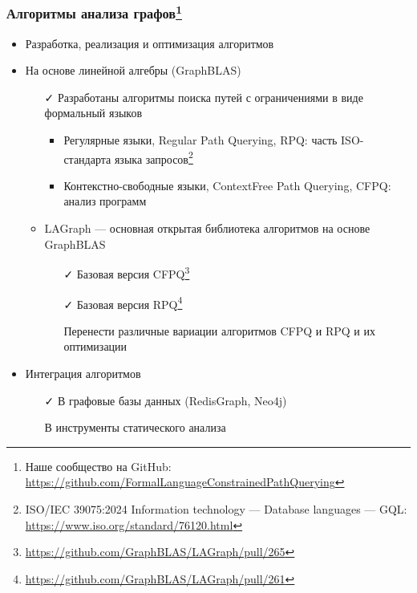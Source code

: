 \documentclass[xcolor=table,aspectratio=169]{beamer}
\begin{document}
\begin{frame}[fragile]
  \frametitle{Алгоритмы анализа графов\footnote{Наше сообщество на GitHub: \url{https://github.com/FormalLanguageConstrainedPathQuerying}}}
  \begin{itemize}
      \item Разработка, реализация и оптимизация алгоритмов
      \item На основе линейной алгебры (GraphBLAS)
      \begin{itemize}
        \item[\faCheck] Разработаны алгоритмы поиска путей с ограничениями в виде формальный языков
        \begin{itemize}
          \item Регулярные языки, Regular Path Querying, RPQ: часть ISO-стандарта языка запросов\footnote{ ISO/IEC 39075:2024 Information technology --- Database languages --- GQL: \url{https://www.iso.org/standard/76120.html}}
          \item Контекстно-свободные языки, ContextFree Path Querying, CFPQ: анализ программ
        \end{itemize}
        \item LAGraph --- основная открытая библиотека алгоритмов на основе GraphBLAS
        \begin{itemize}
          \item[\faCheck] Базовая версия CFPQ\footnote{\url{https://github.com/GraphBLAS/LAGraph/pull/265}}
          \item[\faCheck] Базовая версия RPQ\footnote{\url{https://github.com/GraphBLAS/LAGraph/pull/261}}
          \item[\faGears] Перенести различные вариации алгоритмов CFPQ и RPQ и их оптимизации
        \end{itemize}  
      \end{itemize}
      \item Интеграция алгоритмов
      \begin{itemize}
        \item[\faCheck] В графовые базы данных (RedisGraph, Neo4j)
        \item[\faGears] В инструменты статического анализа
      \end{itemize}
  \end{itemize}
\end{frame}
\end{document}
